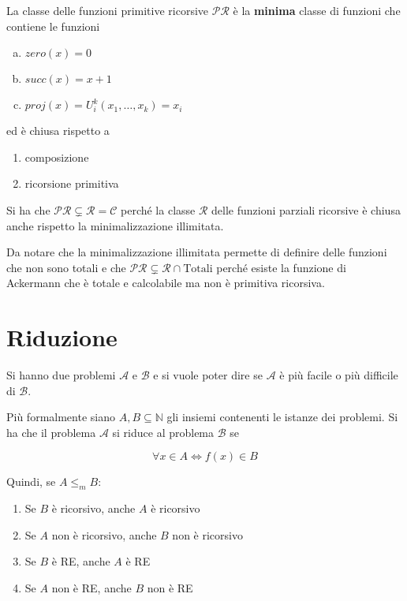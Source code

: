 La classe delle funzioni primitive ricorsive $\mathcal{PR}$ è la \textbf{minima} classe di funzioni che contiene le funzioni

\begin{enumerate}[(a)]
	\item $zero(x) = 0$
	\item $succ(x) = x+1$
	\item $proj(x) = U_{i}^{k}(x_1, \ldots, x_k) = x_i$
\end{enumerate}

ed è chiusa rispetto a 

\begin{enumerate}
	\item composizione
	\item ricorsione primitiva
\end{enumerate}

Si ha che $\mathcal{PR} \subsetneq \mathcal{R} = \mathcal{C}$ perché la classe $\mathcal{R}$ delle funzioni parziali ricorsive è chiusa anche rispetto la minimalizzazione illimitata.

Da notare che la minimalizzazione illimitata permette di definire delle funzioni che non sono totali e che $\mathcal{PR} \subsetneq \mathcal{R} \cap \text{Totali}$ perché esiste la funzione di Ackermann che è totale e calcolabile ma non è primitiva ricorsiva.

\section{Riduzione}

Si hanno due problemi $\mathcal{A}$ e $\mathcal{B}$ e si vuole poter dire se $\mathcal{A}$ è più facile o più difficile di $\mathcal{B}$.

Più formalmente siano $A,B \subseteq \mathbb{N}$ gli insiemi contenenti le istanze dei problemi. Si ha che il problema $\mathcal{A}$ si riduce al problema $\mathcal{B}$ se 

$$
\forall x \in A \Leftrightarrow f(x) \in B
$$

Quindi, se $A \leq_m B$:

\begin{enumerate}
	\item Se $B$ è ricorsivo, anche $A$ è ricorsivo
	\item Se $A$ non è ricorsivo, anche $B$ non è ricorsivo
	\item Se $B$ è RE, anche $A$ è RE
	\item Se $A$ non è RE, anche $B$ non è RE
\end{enumerate}

